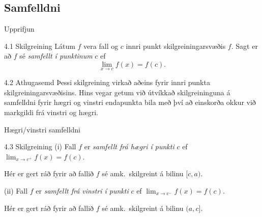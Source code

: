 \documentclass[icelandic,a4paper,12pt]{article}
\begin{document}
\date{10.~september 2012}





\begin{frame}
	\maketitle
\end{frame}

\subsection*{Samfelldni}
\begin{frame}{Upprifjun}
	\pause
 \begin{block}{4.1 Skilgreining}
	Látum $f$ vera fall og $c$ innri punkt skilgreiningarsvæðis $f$.  Sagt
	er að $f$ sé {\em samfellt í punktinum} $c$ ef
	$$\lim_{x\rightarrow c}f(x)=f(c).$$
 \end{block}
	\pause
 \begin{block}{4.2 Athugasemd}
	Þessi skilgreining virkað aðeins fyrir innri punkta skilgreiningarsvæðisins.
	Hins vegar getum við útvíkkað skilgreininguna á samfelldni fyrir 
	hægri og vinstri endapunkta bila með því að einskorða okkur
	við markgildi frá vinstri og hægri.
 \end{block}
\end{frame}

\begin{frame}{Hægri/vinstri samfelldni}	
 \begin{block}{4.3 Skilgreining}
		(i)  Fall $f$ er {\em samfellt frá hægri í punkti} $c$ ef
  $\lim_{x\rightarrow c^+}f(x)=f(c)$.
  
Hér er gert ráð fyrir að fallið $f$ sé amk.~skilgreint á bilinu
  $[c, a)$.

\pause
\medskip

\noindent
(ii)  Fall $f$ er {\em samfellt frá vinstri í punkti} $c$ ef
  $\lim_{x\rightarrow c^-}f(x)=f(c)$.
  
  Hér er gert ráð fyrir að fallið $f$ sé amk.~skilgreint á bilinu
  $(a, c]$.
\end{block}
 \end{frame}
\end{document}
